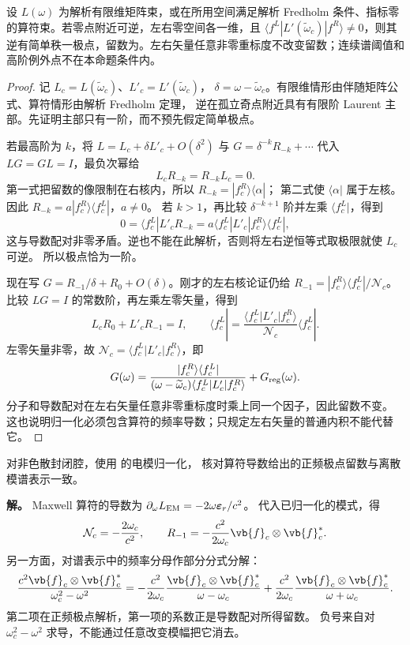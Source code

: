 \begin{lemma}[解析算符束简单零点的逆留数]
设 $L(\omega)$ 为解析有限维矩阵束，或在所用空间满足解析 Fredholm 条件、指标零的算符束。若零点附近可逆，左右零空间各一维，且 $\langle f^L|L\prime(\widetilde\omega_c)|f^R\rangle\ne0$，则其逆有简单秩一极点，留数为。左右矢量任意非零重标度不改变留数；连续谱阈值和高阶例外点不在本命题条件内。
\end{lemma}
\begin{proof}
记 $L_c=L(\widetilde\omega_c)$、$L'_c=L'(\widetilde\omega_c)$，
$\delta=\omega-\widetilde\omega_c$。有限维情形由伴随矩阵公式、算符情形由解析 Fredholm 定理，
逆在孤立奇点附近具有有限阶 Laurent 主部。先证明主部只有一阶，而不预先假定简单极点。

若最高阶为 $k$，将 $L=L_c+\delta L'_c+O(\delta^2)$ 与
$G=\delta^{-k}R_{-k}+\cdots$ 代入 $LG=GL=I$，最负次幂给
\[
L_cR_{-k}=R_{-k}L_c=0.
\]
第一式把留数的像限制在右核内，所以 $R_{-k}=|f_c^R\rangle\langle\alpha|$；
第二式使 $\langle\alpha|$ 属于左核。因此
$R_{-k}=a|f_c^R\rangle\langle f_c^L|$，$a\ne0$。
若 $k>1$，再比较 $\delta^{-k+1}$ 阶并左乘 $\langle f_c^L|$，得到
\[
0=\langle f_c^L|L'_cR_{-k}
=a\langle f_c^L|L'_c|f_c^R\rangle\langle f_c^L|,
\]
这与导数配对非零矛盾。逆也不能在此解析，否则将左右逆恒等式取极限就使 $L_c$ 可逆。
所以极点恰为一阶。

现在写 $G=R_{-1}/\delta+R_0+O(\delta)$。刚才的左右核论证仍给
$R_{-1}=|f_c^R\rangle\langle f_c^L|/\mathcal N_c$。
比较 $LG=I$ 的常数阶，再左乘左零矢量，得到
\[
L_cR_0+L'_cR_{-1}=I,\qquad
\langle f_c^L|=\frac{\langle f_c^L|L'_c|f_c^R\rangle}{\mathcal N_c}
\langle f_c^L|.
\]
左零矢量非零，故 $\mathcal N_c=\langle f_c^L|L'_c|f_c^R\rangle$，即
\[
G(\omega)=\frac{|f_c^R\rangle\langle f_c^L|}
{(\omega-\widetilde\omega_c)\langle f_c^L|L'_c|f_c^R\rangle}
+G_{\rm reg}(\omega).
\]
分子和导数配对在左右矢量任意非零重标度时乘上同一个因子，因此留数不变。
这也说明归一化必须包含算符的频率导数；只规定左右矢量的普通内积不能代替它。
\end{proof}

\begin{exbox}[从算符留数回到封闭无损腔的模式归一化]
对非色散封闭腔，使用 的电模归一化，
核对算符导数给出的正频极点留数与离散模谱表示一致。

\textbf{解。} Maxwell 算符的导数为
$\partial_\omega L_{\rm EM}=-2\omega\boldsymbol\varepsilon_r/c^2$。
代入已归一化的模式，得
\[
\mathcal N_c=-\frac{2\omega_c}{c^2},\qquad
R_{-1}=-\frac{c^2}{2\omega_c}\vb{f}_c\otimes\vb{f}_c^*.
\]
另一方面，对谱表示中的频率分母作部分分式分解：
\[
\frac{c^2\vb{f}_c\otimes\vb{f}_c^*}{\omega_c^2-\omega^2}
=-\frac{c^2}{2\omega_c}\frac{\vb{f}_c\otimes\vb{f}_c^*}{\omega-\omega_c}
+\frac{c^2}{2\omega_c}\frac{\vb{f}_c\otimes\vb{f}_c^*}{\omega+\omega_c}.
\]
第二项在正频极点解析，第一项的系数正是导数配对所得留数。
负号来自对 $\omega_c^2-\omega^2$ 求导，不能通过任意改变模幅把它消去。
\end{exbox}



